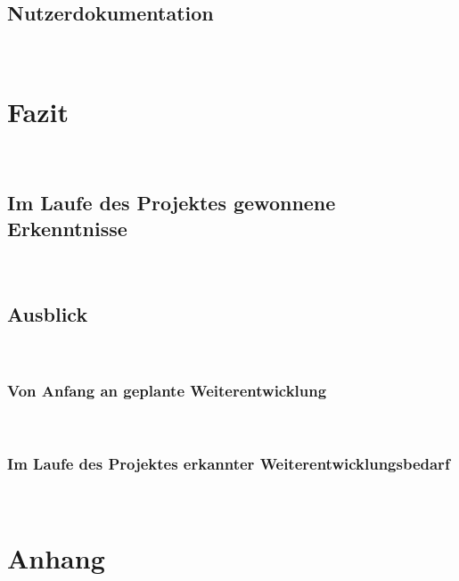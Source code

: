 \documentclass[11pt,toc=sectionentrywithoutdots, 
headheight=44pt, headings=optiontoheadandtoc, hyperfootnotes=false, hypertexnames=false]{scrartcl}
\begin{document}
\subsection{Nutzerdokumentation}
\blindtext\

\section{Fazit}
\blindtext\

\subsection{Im Laufe des Projektes gewonnene Erkenntnisse}
\blindtext\

\subsection{Ausblick}
\blindtext\

\subsubsection{Von Anfang an geplante Weiterentwicklung}
\blindtext\

\subsubsection{Im Laufe des Projektes erkannter Weiterentwicklungsbedarf}
\blindtext\


\newpage
\setcounter{secnumdepth}{0}

{}

\printbibliography




\newpage


\setcounter{page}{1}
\setcounter{secnumdepth}{2}


\renewcommand{\thesection}{A}
\setcounter{section}{1}



\ofoot{\thepage}




\FloatBarrier
\section{Anhang}
\end{document}
